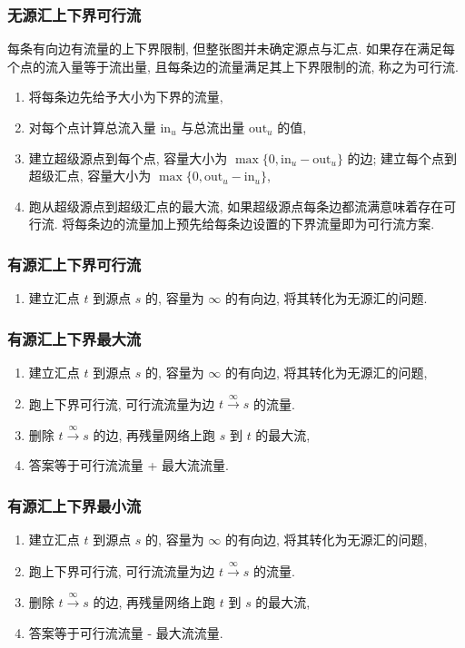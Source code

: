 \documentclass[UTF8, a4paper, titlepage, twoside]{ctexart}
\begin{document}
\subsubsection{ 无源汇上下界可行流 }
每条有向边有流量的上下界限制, 但整张图并未确定源点与汇点. 如果存在满足每个点的流入量等于流出量, 且每条边的流量满足其上下界限制的流, 称之为可行流.
\begin{enumerate}
    \item 将每条边先给予大小为下界的流量,
    \item 对每个点计算总流入量 $\text{in}_u$ 与总流出量 $\text{out}_u$ 的值,
    \item 建立超级源点到每个点, 容量大小为 $\max\{0, \text{in}_u - \text{out}_u\}$ 的边; 建立每个点到超级汇点, 容量大小为 $\max\{0, \text{out}_u - \text{in}_u\}$,
    \item 跑从超级源点到超级汇点的最大流, 如果超级源点每条边都流满意味着存在可行流. 将每条边的流量加上预先给每条边设置的下界流量即为可行流方案.
\end{enumerate}

\subsubsection{ 有源汇上下界可行流 }
\begin{enumerate}
    \item 建立汇点 $t$ 到源点 $s$ 的, 容量为 $\infty$ 的有向边, 将其转化为无源汇的问题.
\end{enumerate}

\subsubsection{ 有源汇上下界最大流 }
\begin{enumerate}
    \item 建立汇点 $t$ 到源点 $s$ 的, 容量为 $\infty$ 的有向边, 将其转化为无源汇的问题,
    \item 跑上下界可行流, 可行流流量为边 $t \xrightarrow{\infty} s$ 的流量.
    \item 删除 $t \xrightarrow{\infty} s$ 的边, 再残量网络上跑 $s$ 到 $t$ 的最大流,
    \item 答案等于可行流流量 + 最大流流量.
\end{enumerate}

\subsubsection{ 有源汇上下界最小流 }
\begin{enumerate}
    \item 建立汇点 $t$ 到源点 $s$ 的, 容量为 $\infty$ 的有向边, 将其转化为无源汇的问题,
    \item 跑上下界可行流, 可行流流量为边 $t \xrightarrow{\infty} s$ 的流量.
    \item 删除 $t \xrightarrow{\infty} s$ 的边, 再残量网络上跑 $t$ 到 $s$ 的最大流,
    \item 答案等于可行流流量 - 最大流流量.
\end{enumerate}
\end{document}
